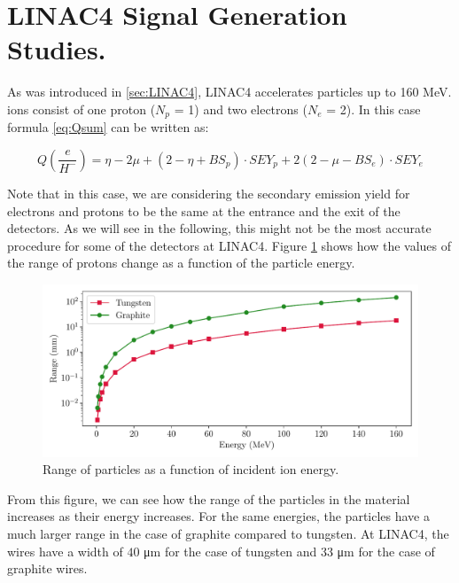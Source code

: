 \pagestyle{fancy}

\graphicspath{ {Figures/Chapter5_SimulationBenchmarking/} }


\section{LINAC4 Signal Generation Studies.}

As was introduced in \ref{sec:LINAC4}, LINAC4 accelerates \hm particles up to 160 MeV. \hm ions consist of one proton ($N_p$ = 1) and two electrons ($N_e$ = 2). In this case formula \ref{eq:Qsum} can be written as: 

\begin{equation}
    Q\left(\frac{e}{H^{-}}\right) = \eta - 2\mu + \left( 2 - \eta + BS_p \right) \cdot SEY_p +2\left( 2 - \mu - BS_e \right) \cdot SEY_e
    \label{eq:Ql4}
\end{equation}

Note that in this case, we are considering the secondary emission yield for electrons and protons to be the same at the entrance and the exit of the detectors. As we will see in the following, this might not be the most accurate procedure for some of the detectors at LINAC4. Figure \ref{fig:RangeLinac4} shows how the values of the range of protons change as a function of the particle energy. 

\begin{figure}[h]
    \centering
    \includegraphics[width=0.9\columnwidth]{RangePlotLinac4/RangeL4.pdf}
    \caption{Range of particles as a function of incident ion energy.}
    \label{fig:RangeLinac4}
\end{figure}

From this figure, we can see how the range of the particles in the material increases as their energy increases. For the same energies, the particles have a much larger range in the case of graphite compared to tungsten. At LINAC4, the wires have a width of $40$ \si{\micro\metre} for the case of tungsten and 33 \si{\micro \metre} for the case of graphite wires. 

